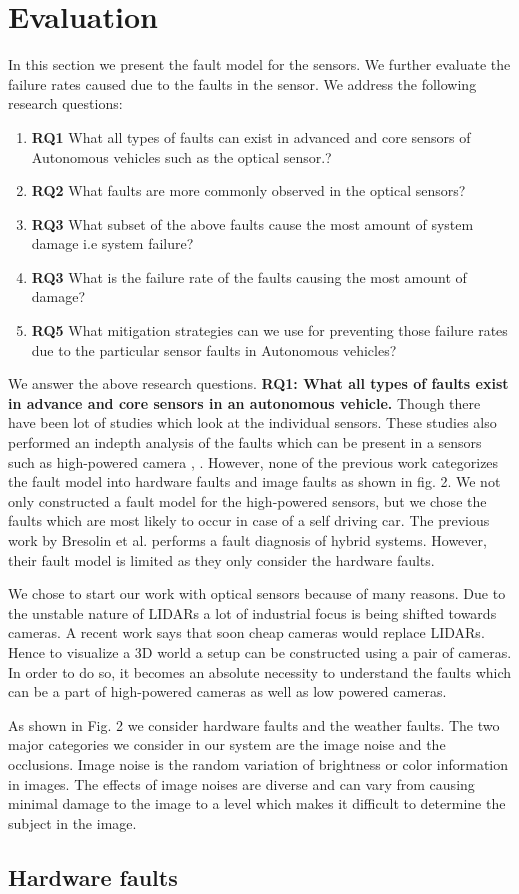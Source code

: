 \section{Evaluation}
In this section we present the fault model for the sensors. We further evaluate the failure rates caused due to the faults in the sensor. We address the following research questions:
\begin{enumerate}
	\item \textbf{RQ1}
	What all types of faults can exist in advanced and core sensors of Autonomous vehicles such as the optical sensor.?
	\item \textbf{RQ2}
	What faults are more commonly observed in the optical sensors?
	\item \textbf{RQ3}
	What subset of the above faults cause the most amount of system damage i.e system failure?
	\item \textbf{RQ3}
	What is the failure rate of the faults causing the most amount of damage?
	\item \textbf{RQ5}
	What mitigation strategies can we use for preventing those failure rates due to the particular sensor faults in Autonomous vehicles?
\end{enumerate}
\vskip 0.2in
We answer the above research questions. 
\vskip 0.2in
\textbf{RQ1: What all types of faults exist in advance and core sensors in an autonomous vehicle.}
Though there have been lot of studies which look at the individual sensors. These studies also performed an indepth analysis of the faults which can be present in a sensors such as high-powered camera \cite{5530865}, \cite{inproceedings}. However, none of the previous work categorizes the fault model into hardware faults and image faults as shown in fig. 2. We not only constructed a fault model for the high-powered sensors, but we chose the faults which are most likely to occur in case of a self driving car. The previous work by Bresolin et al. \cite{inproceedings} performs a fault diagnosis of hybrid systems. However, their fault model is limited as they only consider the hardware faults. 

We chose to start our work with optical sensors because of many reasons. Due to the unstable nature of LIDARs a lot of industrial focus is being shifted towards cameras. A recent work says that soon cheap cameras would replace LIDARs\cite{cheapcamera}. Hence to visualize a 3D world a setup can be constructed using a pair of cameras. In order to do so, it becomes an absolute necessity to understand the faults which can be a part of high-powered cameras as well as low powered cameras. 

As shown in Fig. 2 we consider hardware faults and the weather faults. The two major categories we consider in our system are the image noise and the occlusions. Image noise is the random variation of brightness or color information in images.
The effects of image noises are diverse and can vary from causing minimal damage to the image to
a level which makes it difficult to determine the subject in the image.

\subsection{Hardware faults}